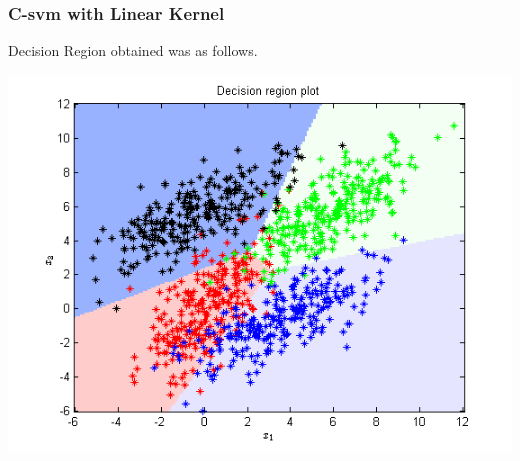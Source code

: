 \documentclass{article}
\begin{document}
\subsubsection{C-svm with Linear Kernel}

Decision Region obtained was as follows.
\begin{center}
\includegraphics[scale=0.8]{Classification/1c/c_linear/dec}
\end{center}
\end{document}
